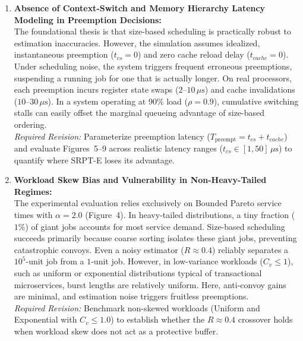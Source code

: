 \documentclass[11pt]{article}
\begin{document}
\begin{enumerate}[label=\textbf{Comment \arabic*:}, leftmargin=1.5em, itemsep=0.2em, parsep=0pt]

    \item \textbf{Absence of Context-Switch and Memory Hierarchy Latency Modeling in Preemption Decisions:} \\
    The foundational thesis is that size-based scheduling is practically robust to estimation inaccuracies. However, the simulation assumes idealized, instantaneous preemption ($t_{cs}=0$) and zero cache reload delay ($t_{cache}=0$). Under scheduling noise, the system triggers frequent erroneous preemptions, suspending a running job for one that is actually longer. On real processors, each preemption incurs register state swaps ($2$--$10\,\mu\text{s}$) and cache invalidations ($10$--$30\,\mu\text{s}$). In a system operating at 90\% load ($\rho=0.9$), cumulative switching stalls can easily offset the marginal queueing advantage of size-based ordering. \\
    \textit{Required Revision:} Parameterize preemption latency ($T_{\text{preempt}} = t_{cs} + t_{cache}$) and evaluate Figures~5--9 across realistic latency ranges ($t_{cs} \in [1, 50]\,\mu\text{s}$) to quantify where SRPT-E loses its advantage.

    \item \textbf{Workload Skew Bias and Vulnerability in Non-Heavy-Tailed Regimes:} \\
    The experimental evaluation relies exclusively on Bounded Pareto service times with $\alpha=2.0$ (Figure~4). In heavy-tailed distributions, a tiny fraction ($1\%$) of giant jobs accounts for most service demand. Size-based scheduling succeeds primarily because coarse sorting isolates these giant jobs, preventing catastrophic convoys. Even a noisy estimator ($R \approx 0.4$) reliably separates a $10^5$-unit job from a $1$-unit job. However, in low-variance workloads ($C_v \le 1$), such as uniform or exponential distributions typical of transactional microservices, burst lengths are relatively uniform. Here, anti-convoy gains are minimal, and estimation noise triggers fruitless preemptions. \\
    \textit{Required Revision:} Benchmark non-skewed workloads (Uniform and Exponential with $C_v \le 1.0$) to establish whether the $R \approx 0.4$ crossover holds when workload skew does not act as a protective buffer.


\end{enumerate}
\end{document}
